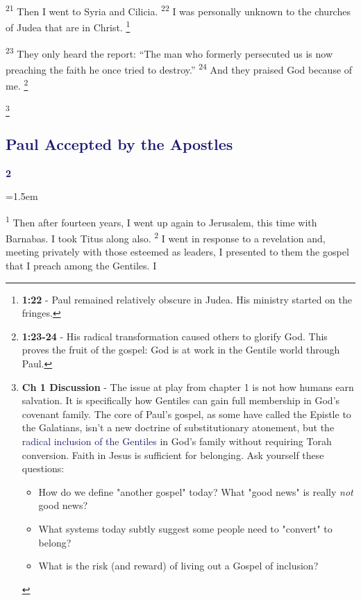 \documentclass[12pt,twoside]{article}
\newcommand{\vs}[1]{\textsuperscript{#1}}
\newcommand{\vnote}[2]{%
  \begingroup
  \renewcommand\thefootnote{}%
  \footnote{\scriptsize \textbf{}#2}%
  \addtocounter{footnote}{-1}%
  \endgroup
}
\newcommand{\chapterWithIndent}[2]{%
  \noindent
  \begin{minipage}[t]{1cm}
    \vspace{-0.4\baselineskip}
    {\textcolor{MidnightBlue}{\fontsize{40pt}{48pt}\selectfont \textbf{#1}}}
  \end{minipage}%
  \hspace{0.3cm}%
  \begin{minipage}[t]{\dimexpr\linewidth - 1.5cm - 0.3cm\relax}
    \hangindent=1.5em
    \hangafter=3
    #2
    \vspace{0.05cm}
  \end{minipage}
}
\begin{document}
\vs{21} Then I went to Syria and Cilicia.
\vs{22} I was personally unknown to the churches of Judea that are in Christ.\vnote{22}{\textbf{1:22} - Paul remained relatively obscure in Judea. His ministry started on the fringes.}
\vs{23} They only heard the report: ``The man who formerly persecuted us is now preaching the faith he once tried to destroy.''
\vs{24} And they praised God because of me.\vnote{24}{\textbf{1:23-24} - His radical transformation caused others to glorify God. This proves the fruit of the gospel: God is at work in the Gentile world through Paul.}
\vnote{24}{\textbf{Ch 1 Discussion} - The issue at play from chapter 1 is not how humans earn salvation. It is specifically how Gentiles can gain full membership in God's covenant family. The core of Paul's gospel, as some have called the Epistle to the Galatians, isn't a new doctrine of substitutionary atonement, but the \textcolor{MidnightBlue}{radical inclusion of the Gentiles} in God's family without requiring Torah conversion. Faith in Jesus is sufficient for belonging. Ask yourself these questions:
\begin{itemize}
    \item How do we define "another gospel" today? What "good news" is really \textit{not} good news?
    \item What systems today subtly suggest some people need to "convert" to belong?
    \item What is the risk (and reward) of living out a Gospel of inclusion?
\end{itemize}
}

\subsection*{{\textcolor{MidnightBlue}{\textbf{Paul Accepted by the Apostles}}}}

\chapterWithIndent{2}{
    \vs{1} Then after fourteen years, I went up again to Jerusalem, this time with Barnabas. I took Titus along also.
    \vs{2} I went in response to a revelation and, meeting privately with those esteemed as leaders, I presented to them the gospel that I preach among the Gentiles. I
}
\end{document}
